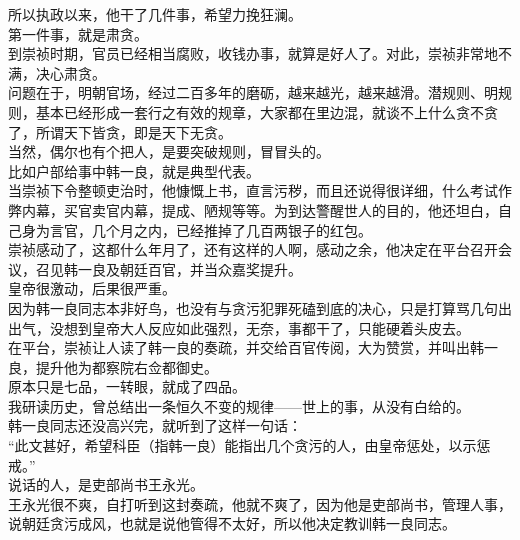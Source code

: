 \begin{multicols}{\theparacolNo}
所以执政以来，他干了几件事，希望力挽狂澜。\\

第一件事，就是肃贪。\\

到崇祯时期，官员已经相当腐败，收钱办事，就算是好人了。对此，崇祯非常地不满，决心肃贪。\\

问题在于，明朝官场，经过二百多年的磨砺，越来越光，越来越滑。潜规则、明规则，基本已经形成一套行之有效的规章，大家都在里边混，就谈不上什么贪不贪了，所谓天下皆贪，即是天下无贪。\\

当然，偶尔也有个把人，是要突破规则，冒冒头的。\\

比如户部给事中韩一良，就是典型代表。\\

当崇祯下令整顿吏治时，他慷慨上书，直言污秽，而且还说得很详细，什么考试作弊内幕，买官卖官内幕，提成、陋规等等。为到达警醒世人的目的，他还坦白，自己身为言官，几个月之内，已经推掉了几百两银子的红包。\\

崇祯感动了，这都什么年月了，还有这样的人啊，感动之余，他决定在平台召开会议，召见韩一良及朝廷百官，并当众嘉奖提升。\\

皇帝很激动，后果很严重。\\

因为韩一良同志本非好鸟，也没有与贪污犯罪死磕到底的决心，只是打算骂几句出出气，没想到皇帝大人反应如此强烈，无奈，事都干了，只能硬着头皮去。\\

在平台，崇祯让人读了韩一良的奏疏，并交给百官传阅，大为赞赏，并叫出韩一良，提升他为都察院右佥都御史。\\

原本只是七品，一转眼，就成了四品。\\

我研读历史，曾总结出一条恒久不变的规律——世上的事，从没有白给的。\\

韩一良同志还没高兴完，就听到了这样一句话：\\

“此文甚好，希望科臣（指韩一良）能指出几个贪污的人，由皇帝惩处，以示惩戒。”\\

说话的人，是吏部尚书王永光。\\

王永光很不爽，自打听到这封奏疏，他就不爽了，因为他是吏部尚书，管理人事，说朝廷贪污成风，也就是说他管得不太好，所以他决定教训韩一良同志。\\


\end{multicols}
